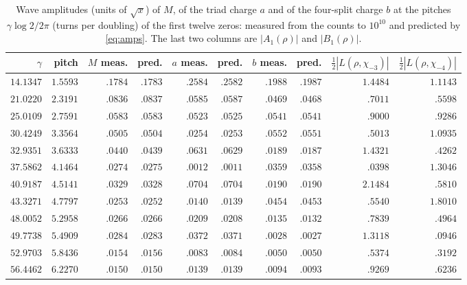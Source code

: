 \documentclass[11pt]{article}
\theoremstyle{definition}\newtheorem{definition}[theorem]{Definition}
\theoremstyle{remark}\newtheorem{remark}[theorem]{Remark}
\theoremstyle{definition}\newtheorem{axiom}{Axiom}
\begin{document}
\begin{table}[!htbp]\centering\small
\setlength{\tabcolsep}{4.2pt}
\begin{tabular}{@{}rrrrrrrrrr@{}}\toprule
$\gamma$ & pitch & $M$ meas. & pred. & $a$ meas. & pred. & $b$ meas. & pred. & $\frac12|L(\rho,\chi_{-3})|$ & $\frac12|L(\rho,\chi_{-4})|$\\\midrule
$14.1347$ & $1.5593$ & $.1784$ & $.1783$ & $.2584$ & $.2582$ & $.1988$ & $.1987$ & $1.4484$ & $1.1143$\\
$21.0220$ & $2.3191$ & $.0836$ & $.0837$ & $.0585$ & $.0587$ & $.0469$ & $.0468$ & $.7011$ & $.5598$\\
$25.0109$ & $2.7591$ & $.0583$ & $.0583$ & $.0523$ & $.0525$ & $.0541$ & $.0541$ & $.9000$ & $.9286$\\
$30.4249$ & $3.3564$ & $.0505$ & $.0504$ & $.0254$ & $.0253$ & $.0552$ & $.0551$ & $.5013$ & $1.0935$\\
$32.9351$ & $3.6333$ & $.0440$ & $.0439$ & $.0631$ & $.0629$ & $.0189$ & $.0187$ & $1.4321$ & $.4262$\\
$37.5862$ & $4.1464$ & $.0274$ & $.0275$ & $.0012$ & $.0011$ & $.0359$ & $.0358$ & $.0398$ & $1.3046$\\
$40.9187$ & $4.5141$ & $.0329$ & $.0328$ & $.0704$ & $.0704$ & $.0190$ & $.0190$ & $2.1484$ & $.5810$\\
$43.3271$ & $4.7797$ & $.0253$ & $.0252$ & $.0140$ & $.0139$ & $.0454$ & $.0453$ & $.5540$ & $1.8010$\\
$48.0052$ & $5.2958$ & $.0266$ & $.0266$ & $.0209$ & $.0208$ & $.0135$ & $.0132$ & $.7839$ & $.4964$\\
$49.7738$ & $5.4909$ & $.0284$ & $.0283$ & $.0372$ & $.0371$ & $.0028$ & $.0027$ & $1.3118$ & $.0946$\\
$52.9703$ & $5.8436$ & $.0154$ & $.0156$ & $.0083$ & $.0084$ & $.0050$ & $.0050$ & $.5374$ & $.3192$\\
$56.4462$ & $6.2270$ & $.0150$ & $.0150$ & $.0139$ & $.0139$ & $.0094$ & $.0093$ & $.9269$ & $.6236$\\\bottomrule
\end{tabular}
\caption{Wave amplitudes (units of $\sqrt x$) of $M$, of the triad charge $a$ and of the four-split charge $b$ at the pitches $\gamma\log2/2\pi$ (turns per doubling) of the first twelve zeros: measured from the counts to $10^{10}$ and predicted by \eqref{eq:amps}. The last two columns are $|A_1(\rho)|$ and $|B_1(\rho)|$.}\label{tab:waves}
\end{table}
\end{document}

